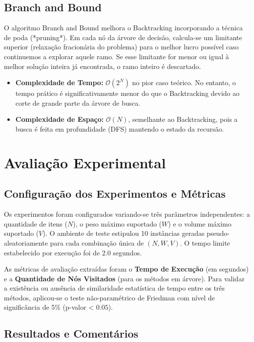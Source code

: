 \documentclass[12pt, a4paper]{article}
\begin{document}
\subsection{Branch and Bound}
O algoritmo Branch and Bound melhora o Backtracking incorporando a técnica de poda (*pruning*). Em cada nó da árvore de decisão, calcula-se um limitante superior (relaxação fracionária do problema) para o melhor lucro possível caso continuemos a explorar aquele ramo. Se esse limitante for menor ou igual à melhor solução inteira já encontrada, o ramo inteiro é descartado. 
\begin{itemize}
    \item \textbf{Complexidade de Tempo:} $\mathcal{O}(2^N)$ no pior caso teórico. No entanto, o tempo prático é significativamente menor do que o Backtracking devido ao corte de grande parte da árvore de busca.
    \item \textbf{Complexidade de Espaço:} $\mathcal{O}(N)$, semelhante ao Backtracking, pois a busca é feita em profundidade (DFS) mantendo o estado da recursão.
\end{itemize}

\section{Avaliação Experimental}

\subsection{Configuração dos Experimentos e Métricas}
Os experimentos foram configurados variando-se três parâmetros independentes: a quantidade de itens ($N$), o peso máximo suportado ($W$) e o volume máximo suportado ($V$). O ambiente de teste estipulou 10 instâncias geradas pseudo-aleatoriamente para cada combinação única de $(N, W, V)$. O tempo limite estabelecido por execução foi de 2.0 segundos.

As métricas de avaliação extraídas foram o \textbf{Tempo de Execução} (em segundos) e a \textbf{Quantidade de Nós Visitados} (para os métodos em árvore). Para validar a existência ou ausência de similaridade estatística de tempo entre os três métodos, aplicou-se o teste não-paramétrico de Friedman com nível de significância de 5\% (p-valor < $0.05$).

\subsection{Resultados e Comentários}
\end{document}
